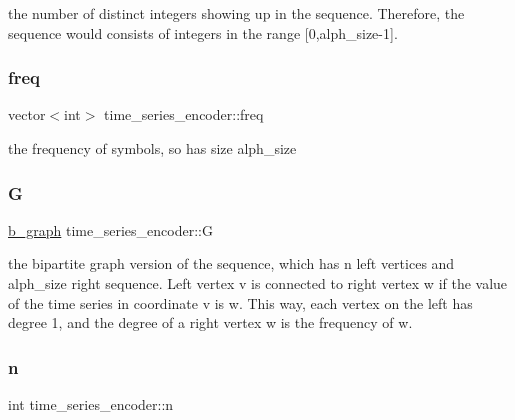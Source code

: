 the number of distinct integers showing up in the sequence. Therefore, the sequence would consists of integers in the range \mbox{[}0,alph\+\_\+size-\/1\mbox{]}. 

\mbox{\label{classtime__series__encoder_ac6496aa39f28da4d8fe964c495e76057}} 
\subsubsection{\texorpdfstring{freq}{freq}}
{\footnotesize\ttfamily vector$<$int$>$ time\+\_\+series\+\_\+encoder\+::freq\hspace{0.3cm}{\ttfamily [private]}}



the frequency of symbols, so has size alph\+\_\+size 

\mbox{\label{classtime__series__encoder_aa40f761a56f696e78e8888e50e8f45b9}} 
\subsubsection{\texorpdfstring{G}{G}}
{\footnotesize\ttfamily \hyperlink{classb__graph}{b\+\_\+graph} time\+\_\+series\+\_\+encoder\+::G\hspace{0.3cm}{\ttfamily [private]}}



the bipartite graph version of the sequence, which has n left vertices and alph\+\_\+size right sequence. Left vertex v is connected to right vertex w if the value of the time series in coordinate v is w. This way, each vertex on the left has degree 1, and the degree of a right vertex w is the frequency of w. 

\mbox{\label{classtime__series__encoder_ab84b7528d50c495fc140f1eb50d9b539}} 
\subsubsection{\texorpdfstring{n}{n}}
{\footnotesize\ttfamily int time\+\_\+series\+\_\+encoder\+::n\hspace{0.3cm}{\ttfamily [private]}}



